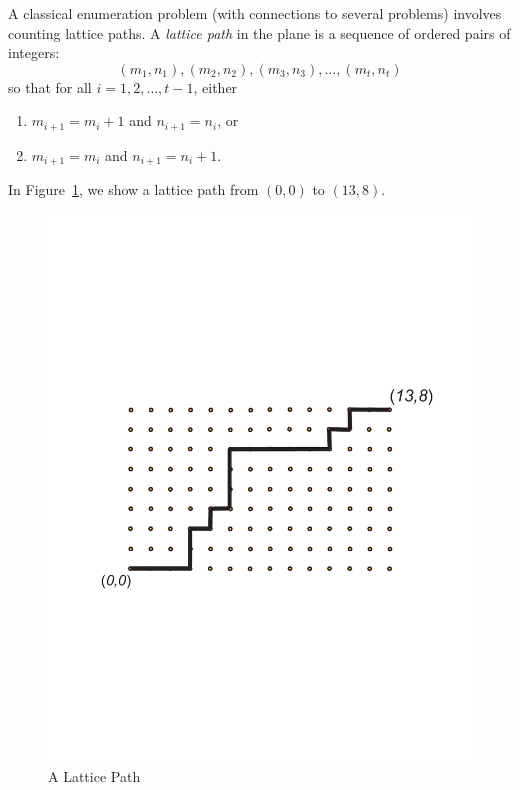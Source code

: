A classical enumeration problem (with connections to several problems)
involves counting lattice paths. A \textit{lattice path} in the plane
is a sequence of ordered pairs of integers:
\[
(m_1,n_1), (m_2,n_2), (m_3,n_3),\dots,(m_t,n_t)
\]
so that for all $i=1,2,\dots,t-1$, either
\begin{enumerate}
\item  $m_{i+1}=m_{i}+1$ and $n_{i+1}=n_i$, or
\item  $m_{i+1}=m_i$ and $n_{i+1}=n_{i}+1$.
\end{enumerate}

In Figure~\ref{fig:latticepath}, we show a lattice path from
$(0,0)$ to $(13,8)$.

\begin{figure}
\begin{center}
\includegraphics[viewport=72 252 552 540,scale=.4]{string-figs/3012-fig22}
\caption{A Lattice Path}
\label{fig:latticepath}
\end{center}
\end{figure}


